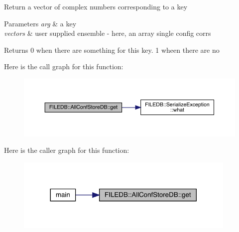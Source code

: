 Return a vector of complex numbers corresponding to a key 
\begin{DoxyParams}{Parameters}
{\em arg} & a key \\
\hline
{\em vectors} & user supplied ensemble -\/ here, an array single config corrs \\
\hline
\end{DoxyParams}
\begin{DoxyReturn}{Returns}
0 when there are something for this key. 1 wheen there are no 
\end{DoxyReturn}
Here is the call graph for this function\+:
\nopagebreak
\begin{figure}[H]
\begin{center}
\leavevmode
\includegraphics[width=350pt]{df/db6/classFILEDB_1_1AllConfStoreDB_a848466f7dce25cacc4e8560c50240d35_cgraph}
\end{center}
\end{figure}
Here is the caller graph for this function\+:\nopagebreak
\begin{figure}[H]
\begin{center}
\leavevmode
\includegraphics[width=300pt]{df/db6/classFILEDB_1_1AllConfStoreDB_a848466f7dce25cacc4e8560c50240d35_icgraph}
\end{center}
\end{figure}
\mbox{\label{classFILEDB_1_1AllConfStoreDB_aeb8e6daf1a1f9b7a19899cf7db365632}} 
